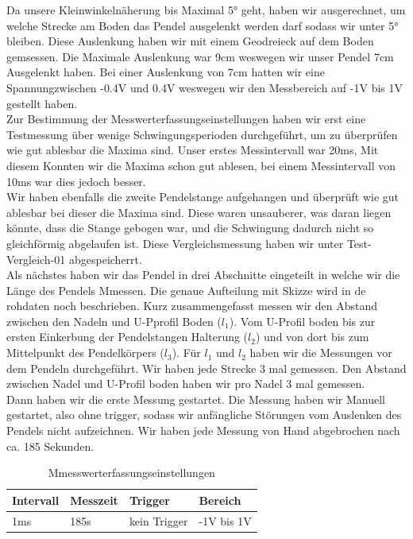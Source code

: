 \documentclass[twoside]{protokoll}
\begin{document}
Da unsere Kleinwinkelnäherung bis Maximal 5° geht, haben wir ausgerechnet, um welche Strecke am Boden das Pendel ausgelenkt werden darf sodass wir unter 5° bleiben. 
Diese Auslenkung haben wir mit einem Geodreieck auf dem Boden gemsessen. 
Die Maximale Auslenkung war 9cm weswegen wir unser Pendel 7cm Ausgelenkt haben.
Bei einer Auslenkung von 7cm hatten wir eine Spannungzwischen -0.4V und 0.4V weswegen wir den Messbereich auf -1V bis 1V gestellt haben.\\

Zur Bestimmung der Messwerterfassungseinstellungen haben wir erst eine Testmessung über wenige Schwingungsperioden durchgeführt, um zu überprüfen wie gut ablesbar die Maxima sind.
Unser erstes Messintervall war 20ms, Mit diesem Konnten wir die Maxima schon gut ablesen, bei einem Messintervall von 10ms war dies jedoch besser.\\
Wir haben ebenfalls die zweite Pendelstange aufgehangen und überprüft wie gut ablesbar bei dieser die Maxima sind.
 Diese waren unsauberer, was daran liegen könnte, dass die Stange gebogen war, und die Schwingung dadurch nicht so gleichförmig abgelaufen ist.
 Diese Vergleichsmessung haben wir unter Test-Vergleich-01 abgespeicherrt. \\

 Als nächstes haben wir das Pendel in drei Abschnitte eingeteilt in welche wir die Länge des Pendels Mmessen. 
 Die genaue Aufteilung mit Skizze wird in de rohdaten noch beschrieben. Kurz zusammengefasst messen wir den Abstand zwischen den Nadeln und U-Pprofil Boden ($l_1$).
Vom U-Profil boden bis zur ersten Einkerbung der Pendelstangen Halterung ($l_2$) und von dort bis zum Mittelpunkt des Pendelkörpers ($l_3$).
Für $l_1$ und $l_2$ haben wir die Messungen vor dem Pendeln durchgeführt. 
Wir haben jede Strecke 3 mal gemessen. Den Abstand zwischen Nadel und U-Profil boden haben wir pro Nadel 3 mal gemessen.\\

Dann haben wir die erste Messung gestartet. 
Die Messung haben wir Manuell gestartet, also ohne trigger, sodass wir anfängliche Störungen vom Auslenken des Pendels nicht aufzeichnen. 
Wir haben jede Messung von Hand abgebrochen nach ca. 185 Sekunden. 
\begin{table}[H]
        \centering
        \begin{tabularx}{1.0\textwidth}{X X X X} %
            \toprule
            \textbf{Intervall} & \textbf{Messzeit} & \textbf{Trigger} & \textbf{Bereich} \\
            \midrule
            1ms & 185s & kein Trigger & -1V bis 1V \\
            \bottomrule
        \end{tabularx}
        \caption{Mmesswerterfassungseinstellungen}
        \label{tab:mytable}
    \end{table}
\end{document}
